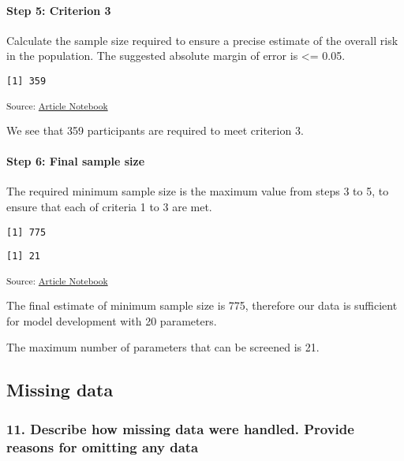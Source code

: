 \documentclass[
  letterpaper,
  DIV=11,
  numbers=noendperiod]{scrartcl}
\let\oldparagraph\paragraph
\renewcommand{\paragraph}[1]{\oldparagraph{#1}\mbox{}}
\begin{document}
\paragraph{Step 5: Criterion 3}\label{step-5-criterion-3}

Calculate the sample size required to ensure a precise estimate of the
overall risk in the population. The suggested absolute margin of error
is \textless= 0.05.

\begin{verbatim}
[1] 359
\end{verbatim}

\textsubscript{Source:
\href{https://AnTangQuoc.github.io/LZD-TP-pred-model/index.qmd.html}{Article
Notebook}}

We see that 359 participants are required to meet criterion 3.

\paragraph{Step 6: Final sample size}\label{step-6-final-sample-size}

The required minimum sample size is the maximum value from steps 3 to 5,
to ensure that each of criteria 1 to 3 are met.

\begin{verbatim}
[1] 775
\end{verbatim}

\begin{verbatim}
[1] 21
\end{verbatim}

\textsubscript{Source:
\href{https://AnTangQuoc.github.io/LZD-TP-pred-model/index.qmd.html}{Article
Notebook}}

The final estimate of minimum sample size is 775, therefore our data is
sufficient for model development with 20 parameters.

The maximum number of parameters that can be screened is 21.

\subsection{Missing data}\label{missing-data}

\subsubsection{11. Describe how missing data were handled. Provide
reasons for omitting any
data}\label{describe-how-missing-data-were-handled.-provide-reasons-for-omitting-any-data}
\end{document}
